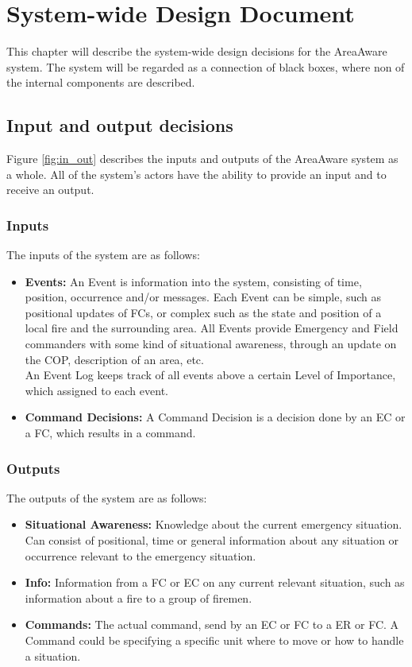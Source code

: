 \chapter{System-wide Design Document}
\label{chp:system-wide}

This chapter will describe the system-wide design decisions for the AreaAware system. The system will be regarded as a connection of black boxes, where non of the internal components are described.

\section{Input and output decisions}
Figure \ref{fig:in_out} describes the inputs and outputs of the AreaAware system as a whole. All of the system's actors have the ability to provide an input and to receive an output.\\


\subsection{Inputs}
The inputs of the system are as follows:

\begin{itemize}
	\item \textbf{Events:} An Event is information into the system, consisting of time, position, occurrence and/or messages. Each Event can be simple, such as positional updates of FCs, or complex such as the state and position of a local fire and the surrounding area. All Events provide Emergency and Field commanders with some kind of situational awareness, through an update on the COP, description of an area, etc. \\
	An Event Log keeps track of all events above a certain Level of Importance, which assigned to each event.
	\item \textbf{Command Decisions:} A Command Decision is a decision done by an EC or a FC, which results in a command.
\end{itemize}

\subsection{Outputs}
The outputs of the system are as follows:

\begin{itemize}
	\item \textbf{Situational Awareness:} Knowledge about the current emergency situation. Can consist of positional, time or general information about any situation or occurrence relevant to the emergency situation.
	\item \textbf{Info:} Information from a FC or EC on any current relevant situation, such as information about a fire to a group of firemen.
	\item \textbf{Commands:} The actual command, send by an EC or FC to a ER or FC. A Command could be specifying a specific unit where to move or how to handle a situation.
\end{itemize}

